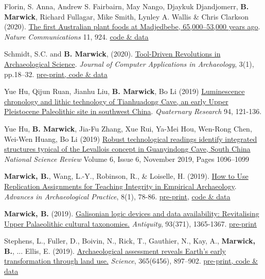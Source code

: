 \documentclass[11pt,article,oneside]{memoir}
\begin{document}

\ind Florin, S. Anna, Andrew S. Fairbairn, May Nango, Djaykuk Djandjomerr, \textbf{B. Marwick}, Richard Fullagar, Mike Smith, Lynley A. Wallis \& Chris Clarkson (2020). \href{https://doi.org/10.1038/s41467-020-14723-0}{The first Australian plant foods at Madjedbebe, 65,000–53,000 years ago}. \textit{Nature Communications} 11, 924. \href{https://doi.org/10.17605/OSF.IO/YDUZP }{code \& data}

\ind Schmidt, S.C. and \textbf{B. Marwick}, (2020). \href{http://doi.org/10.5334/jcaa.29}{Tool-Driven Revolutions in Archaeological Science}. \textit{Journal of Computer Applications in Archaeology}, 3(1), pp.18–32. \href{https://doi.org/10.17605/OSF.IO/RHVN5}{pre-print, code \& data}

\ind Yue Hu, Qijun Ruan, Jianhu Liu, \textbf{B. Marwick}, Bo Li (2019) \href{http://doi.org/10.1017/qua.2019.67}{Luminescence chronology and lithic technology of Tianhuadong Cave, an early Upper Pleistocene Paleolithic site in southwest China}. \textit{Quaternary Research} 94, 121-136.

\ind Yue Hu, \textbf{B. Marwick}, Jia-Fu Zhang, Xue Rui, Ya-Mei Hou, Wen-Rong Chen, Wei-Wen Huang, Bo Li (2019) \href{https://doi.org/10.1093/nsr/nwz192}{Robust technological readings identify integrated structures typical of the Levallois concept in Guanyindong Cave, South China} \textit{National Science Review} Volume 6, Issue 6, November 2019, Pages 1096–1099 

\ind \textbf{Marwick, B.}, Wang, L.-Y., Robinson, R., \& Loiselle, H. (2019). \href{https://doi.org/10.1017/aap.2019.38}{How to Use Replication Assignments for Teaching Integrity in Empirical Archaeology}. \textit{Advances in Archaeological Practice}, 8(1), 78-86. \href{https://osf.io/preprints/socarxiv/tsxbv/}{pre-print}, \href{https://doi.org/10.17605/OSF.IO/DBSW9}{code \& data}

\ind \textbf{Marwick, B.} (2019). \href{https://doi.org/10.15184/aqy.2019.131}{Galisonian logic devices and data availability: Revitalising Upper Palaeolithic cultural taxonomies.} \textit{Antiquity}, 93(371), 1365-1367. \href{https://osf.io/preprints/socarxiv/v8dej/}{pre-print}

\ind Stephens, L., Fuller, D., Boivin, N., Rick, T., Gauthier, N., Kay, A., \textbf{Marwick, B.}, ...  Ellis, E. (2019). \href{https://doi.org/10.1126/science.aax1192}{Archaeological assessment reveals Earth’s early transformation through land use.} \textit{Science}, 365(6456), 897–902. \href{https://dataverse.harvard.edu/dataverse/ArchaeoGLOBE}{pre-print, code \& data}
\end{document}
